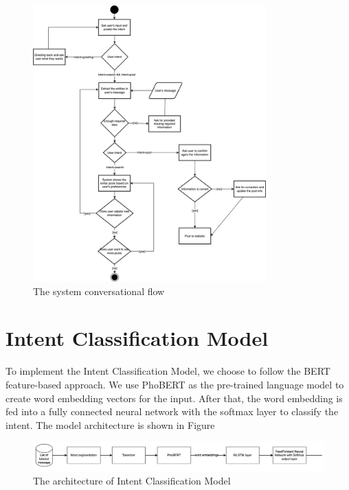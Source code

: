 \begin{figure}[ht]
    \centering
    \includegraphics[width=0.8\textwidth]{../Images/7.System_Modeling/conversational_flow.png}
    \caption{The system conversational flow}
    \label{fig:conversational-flow}
\end{figure}

\section{Intent Classification Model}
\label{sec:intent-classification-model}
To implement the Intent Classification Model, we choose to follow the BERT feature-based approach. We use PhoBERT as the pre-trained language model to create word embedding vectors for the input. After that, the word embedding is fed into a fully connected neural network with the softmax layer to classify the intent. The model architecture is shown in Figure

\begin{figure}[ht]
    \centering
    \includegraphics[width=\textwidth]{../Images/7.System_Modeling/intent_classifier_architecture.png}
    \caption{The architecture of Intent Classification Model}
    \label{fig:intent-classification-model}
\end{figure}

